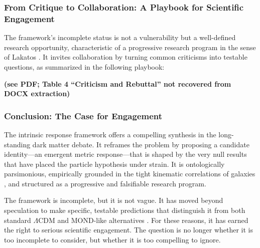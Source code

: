 \subsubsection{From Critique to Collaboration: A Playbook for Scientific Engagement}

The framework's incomplete status is not a vulnerability but a well-defined research opportunity, characteristic of a progressive research program in the sense of Lakatos \citep{Lakatos1978}. It invites collaboration by turning common criticisms into testable questions, as summarized in the following playbook:

\textbf{(see PDF; Table 4 ``Criticism and Rebuttal'' not recovered from DOCX extraction)}

\subsubsection{Conclusion: The Case for Engagement}

The intrinsic response framework offers a compelling synthesis in the long-standing dark matter debate. It reframes the problem by proposing a candidate identity---an emergent metric response---that is shaped by the very null results that have placed the particle hypothesis under strain. It is ontologically parsimonious, empirically grounded in the tight kinematic correlations of galaxies \citep{McGaughLelliSchombert2016}, and structured as a progressive and falsifiable research program.

The framework is incomplete, but it is not vague. It has moved beyond speculation to make specific, testable predictions that distinguish it from both standard $\Lambda$CDM and MOND-like alternatives \citep{BullockBoylanKolchin2017,Verlinde2017}. For these reasons, it has earned the right to serious scientific engagement. The question is no longer whether it is too incomplete to consider, but whether it is too compelling to ignore.


